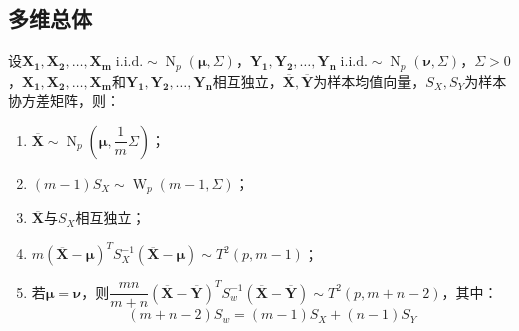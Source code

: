 \subsection{多维总体}
\begin{theorem}\label{theo:MultiVariateSamplingDist}
	设$\mathbf{X_1},\mathbf{X_2},\dots,\mathbf{X_m}\;\text{i.i.d.}\sim\operatorname{N}_p(\boldsymbol{\mu},\Sigma)$，$\mathbf{Y_1},\mathbf{Y_2},\dots,\mathbf{Y_n}\;\text{i.i.d.}\sim \operatorname{N}_p(\boldsymbol{\nu},\Sigma)$，$\Sigma>0$，$\mathbf{X_1},\mathbf{X_2},\dots,\mathbf{X_m}$和$\mathbf{Y_1},\mathbf{Y_2},\dots,\mathbf{Y_n}$相互独立，$\overline{\mathbf{X}},\overline{\mathbf{Y}}$为样本均值向量，$S_X,S_Y$为样本协方差矩阵，则：
	\begin{enumerate}
		\item $\overline{\mathbf{X}}\sim\operatorname{N}_p\left(\boldsymbol{\mu},\dfrac{1}{m}\Sigma\right)$；
		\item $(m-1)S_X\sim\operatorname{W}_p(m-1,\Sigma)$；
		\item $\overline{\mathbf{X}}$与$S_X$相互独立；
		\item $m(\overline{\mathbf{X}}-\boldsymbol{\mu})^TS_X^{-1}(\overline{\mathbf{X}}-\boldsymbol{\mu})\sim T^2(p,m-1)$；
		\item 若$\boldsymbol{\mu}=\boldsymbol{\nu}$，则$\dfrac{mn}{m+n}(\overline{\mathbf{X}}-\overline{\mathbf{Y}})^TS_{w}^{-1}(\overline{\mathbf{X}}-\overline{\mathbf{Y}})\sim T^2(p,m+n-2)$，其中：
		\begin{equation*}
			(m+n-2)S_w=(m-1)S_X+(n-1)S_Y 
		\end{equation*}
	\end{enumerate}
\end{theorem}
